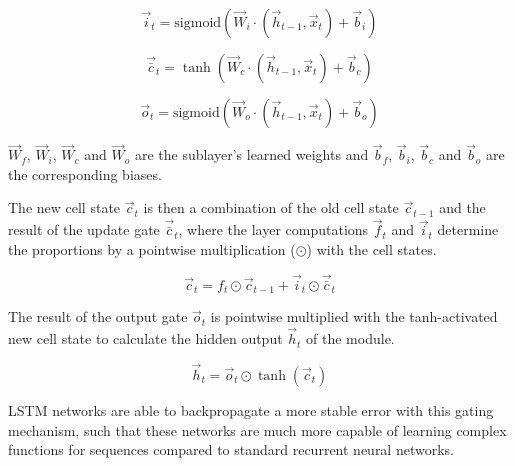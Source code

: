 \begin{equation*}
	\vec{i}_t =  \text{sigmoid} (\vec{W}_i \cdot (\vec{h}_{t-1}, \vec{x}_t) + \vec{b}_i)
\end{equation*}

\begin{equation*}
	\vec{\bar{c}}_t = \tanh (\vec{W}_c \cdot (\vec{h}_{t-1}, \vec{x}_t) + \vec{b}_c)
\end{equation*}

\begin{equation*}
	\vec{o}_t =  \text{sigmoid} (\vec{W}_o \cdot (\vec{h}_{t-1}, \vec{x}_t) + \vec{b}_o)
\end{equation*}

$\vec{W}_f$, $\vec{W}_i$, $\vec{W}_c$ and $\vec{W}_o$ are the sublayer's learned weights and $\vec{b}_f$, $\vec{b}_i$, $\vec{b}_c$ and $\vec{b}_o$ are the corresponding biases.

The new cell state $\vec{c}_t$ is then a combination of the old cell state $\vec{c}_{t-1}$ and the result of the update gate $\vec{\bar{c}}_t$, where the layer computations $\vec{f}_t$ and $\vec{i}_t$ determine the proportions by a pointwise multiplication ($\odot$) with the cell states.

\begin{equation*}
	\vec{c}_t = f_t \odot \vec{c}_{t-1} + \vec{i}_t \odot \vec{\bar{c}}_t
\end{equation*}

The result of the output gate $\vec{o}_t$ is pointwise multiplied with the tanh-activated new cell state to calculate the hidden output $\vec{h}_t$ of the module.

\begin{equation*}
	\vec{h}_t = \vec{o}_t \odot \tanh(\vec{c}_t )
\end{equation*}

LSTM networks are able to backpropagate a more stable error with this gating mechanism, such that these networks are much more capable of learning complex functions for sequences compared to standard recurrent neural networks.